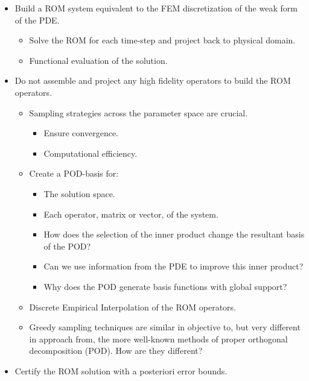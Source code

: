 \documentclass[../main.tex]{subfiles}
\begin{document}
\begin{itemize}
    \item Build a ROM system equivalent to the FEM discretization of the weak form of the PDE.
    \begin{itemize}
        \item Solve the ROM for each time-step and project back to physical domain.
        \item Functional evaluation of the solution.
    \end{itemize}
    \item Do not assemble and project any high fidelity operators to build the ROM operators.
    \begin{itemize}
        \item Sampling strategies across the parameter space are crucial.
            \begin{itemize}
                \item Ensure convergence.
                \item Computational efficiency.
            \end{itemize}
        \item Create a POD-basis for:
        \begin{itemize}
            \item The solution space.
            \item Each operator, matrix or vector, of the system.
            \item How does the selection of the inner product change the resultant basis of the POD?
            \item Can we use information from the PDE to improve this inner product?
            \item Why does the POD generate basis functions with global support? 
        \end{itemize}
        \item Discrete Empirical Interpolation of the ROM operators.
        \item Greedy sampling techniques are similar in objective to, but very different in approach from, the more well-known methods of proper orthogonal decomposition (POD). How are they different?
    \end{itemize}
    \item Certify the ROM solution with a posteriori error bounds.
\end{itemize}
\end{document}
